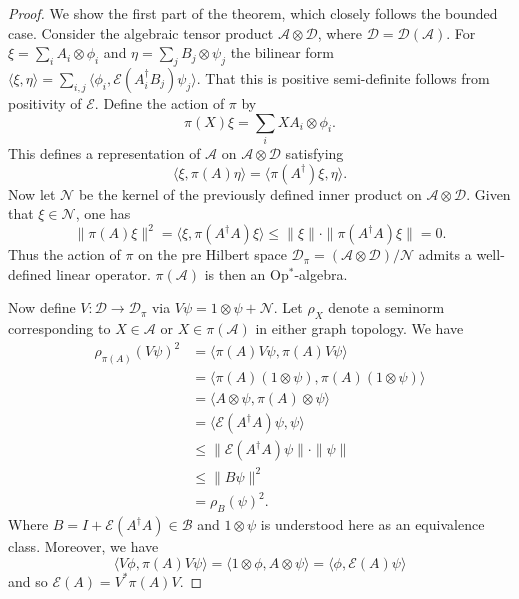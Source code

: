 \documentclass[12pt]{article}
\newcommand\mc{\mathcal}
\newcommand\ms{\mathscr}
\newcommand{\ip}[2]{\langle #1, #2 \rangle}
\begin{document}
\begin{proof}
	We show the first part of the theorem, which closely follows the bounded case. Consider the algebraic tensor product 
	$\ms{A} \otimes \mc{D}$, where $\mc{D} = \mc{D}(\ms{A})$. For $\xi = \sum_i A_i \otimes \phi_i$ and 
	$\eta = \sum_j B_j \otimes \psi_j$ the bilinear form $\ip{\xi}{\eta} = \sum_{i, j}\ip{\phi_i}{\mc{E}(A^\dagger_iB_j)\psi_j}$.
	That this is positive semi-definite follows from positivity of $\mc{E}$. Define the action of $\pi$ by 
	\[\pi(X)\xi = \sum_i XA_i \otimes \phi_i.\] This defines a representation of $\ms{A}$ on $\ms{A} \otimes \mc{D}$ satisfying
	\[\ip{\xi}{\pi(A)\eta} = \ip{\pi(A^\dagger)\xi}{\eta}.\] Now let $\mc{N}$ be the kernel of the previously defined inner product
	on $\ms{A} \otimes \mc{D}$. Given that $\xi \in \mc{N}$, one has
	\[\|\pi(A)\xi\|^2 = \ip{\xi}{\pi(A^\dagger A)\xi} \le \|\xi\|\cdot\|\pi(A^\dagger A)\xi\| = 0.\]
	Thus the action of $\pi$ on the pre Hilbert space $\mc{D}_\pi = (\ms{A} \otimes \mc{D})/\mc{N}$ admits a well-defined 
	linear operator. $\pi(\ms{A})$ is then an Op$^*$-algebra.

	Now define $V:\mc{D} \to \mc{D_\pi}$ via $V\psi = 1 \otimes \psi + \mc{N}$. Let $\rho_X$ denote a seminorm corresponding
	to $X \in \ms{A}$ or $X \in \pi(\ms{A})$ in either graph topology. We have 
	\begin{align*}
	\rho_{\pi(A)}(V\psi)^2 &= \ip{\pi(A)V\psi}{\pi(A)V\psi} \\
	&= \ip{\pi(A)(1 \otimes \psi)}{\pi(A)(1 \otimes \psi)} \\
	&= \ip{A \otimes \psi}{\pi(A) \otimes \psi} \\
	&= \ip{\mc{E}(A^\dagger A)\psi}{\psi} \\
	&\le \|\mc{E}(A^\dagger A)\psi\|\cdot\|\psi\| \\
	&\le \|B\psi\|^2 \\
	&= \rho_B(\psi)^2.
	\end{align*}
	Where $B = I + \mc{E}(A^\dagger A) \in \ms{B}$ and $1 \otimes \psi$ is understood here as an equivalence class. Moreover, 
	we have \[\ip{V\phi}{\pi(A)V\psi} = \ip{1 \otimes \phi}{A \otimes \psi} = \ip{\phi}{\mc{E}(A)\psi}\] and so 
	$\mc{E}(A) = V^*\pi(A)V$. 


\end{proof}
\end{document}
